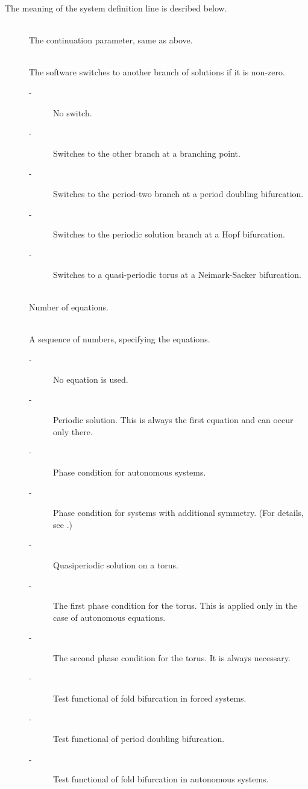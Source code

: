 \documentclass[10pt,a4paper]{ddedoc}
\begin{document}
The meaning of the system definition line is desribed below.
\begin{description}
\item[] ~\\
	The continuation parameter, same as above.
%
\item[] ~\\
	The software switches to another branch of solutions if it is non-zero.
\begin{description}
\item[ -] No switch.
\item[ -] Switches to the other branch at a branching point. %
\item[ -] Switches to the period-two branch at a period doubling bifurcation.
\item[ -] Switches to the periodic solution branch at a Hopf bifurcation.
\item[ -] Switches to a quasi-periodic torus at a Neimark-Sacker bifurcation.
\end{description}
\item[] ~\\
	Number of equations.
\item[] ~\\
	A sequence of numbers, specifying the equations.
\begin{description}
\item[ -] No equation is used.
\item[ -] Periodic solution. This is always the first equation and can occur only there.
\item[ -] Phase condition for autonomous systems.
\item[ -] Phase condition for systems with additional symmetry. (For details, see \cite{haegeman}.)
\item[ -] Quasiperiodic solution on a torus.
\item[ -] The first phase condition for the torus. This is applied only in the case of autonomous equations.
\item[ -] The second phase condition for the torus. It is always necessary.
\item[ -] Test functional of fold bifurcation in forced systems.
\item[ -] Test functional of period doubling bifurcation.
\item[ -] Test functional of fold bifurcation in autonomous systems.

\end{description}
\end{description}
\end{document}
